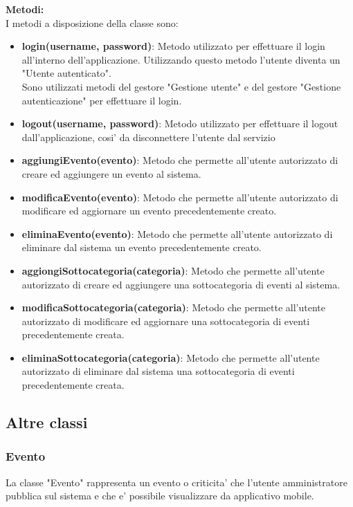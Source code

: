 \documentclass{article}
\begin{document}
\textbf{Metodi:}\\
I metodi a disposizione della classe sono:
\begin{itemize}
    \item \textbf{login(username, password)}: Metodo utilizzato per effettuare il login all'interno dell'applicazione. Utilizzando questo metodo l'utente diventa un "Utente autenticato".\\Sono utilizzati metodi del gestore "Gestione utente" e del gestore "Gestione autenticazione" per effettuare il login.
    \item \textbf{logout(username, password)}: Metodo utilizzato per effettuare il logout dall'applicazione, cosi' da disconnettere l'utente dal servizio
    \item \textbf{aggiungiEvento(evento)}: Metodo che permette all'utente autorizzato di creare ed aggiungere un evento al sistema.
    \item \textbf{modificaEvento(evento)}: Metodo che permette all'utente autorizzato di modificare ed aggiornare un evento precedentemente creato.
    \item \textbf{eliminaEvento(evento)}: Metodo che permette all'utente autorizzato di eliminare dal sistema un evento precedentemente creato.
    \item \textbf{aggiongiSottocategoria(categoria)}: Metodo che permette all'utente autorizzato di creare ed aggiungere una sottocategoria di eventi al sistema.
    \item \textbf{modificaSottocategoria(categoria)}: Metodo che permette all'utente autorizzato di modificare ed aggiornare una sottocategoria di eventi precedentemente creata.
    \item \textbf{eliminaSottocategoria(categoria)}: Metodo che permette all'utente autorizzato di eliminare dal sistema una sottocategoria di eventi precedentemente creata.
\end{itemize}

\clearpage

\subsection{Altre classi}

\subsubsection{Evento}

La classe "Evento" rappresenta un evento o criticita' che l'utente amministratore pubblica sul sistema e che e' possibile visualizzare da applicativo mobile.
\end{document}
